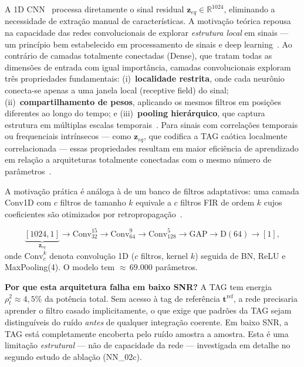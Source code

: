 \documentclass[12pt,a4paper]{article}
\begin{document}
A 1D CNN~\cite{ref_liao,ref_oshea2017} processa diretamente o sinal residual $\mathbf{z}_{eq} \in \mathbb{R}^{1024}$, eliminando a necessidade de extração manual de características. A motivação teórica repousa na capacidade das redes convolucionais de explorar \emph{estrutura local} em sinais --- um princípio bem estabelecido em processamento de sinais e deep learning~\cite{ref_sainath2015,ref_oshea2017}. Ao contrário de camadas totalmente conectadas (Dense), que tratam todas as dimensões de entrada com igual importância, camadas convolucionais exploram três propriedades fundamentais: (i)~\textbf{localidade restrita}, onde cada neurônio conecta-se apenas a uma janela local (receptive field) do sinal; (ii)~\textbf{compartilhamento de pesos}, aplicando os mesmos filtros em posições diferentes ao longo do tempo; e (iii)~\textbf{pooling hierárquico}, que captura estrutura em múltiplas escalas temporais~\cite{ref_sainath2015}. Para sinais com correlações temporais ou frequenciais intrínsecos --- como $\mathbf{z}_{eq}$, que codifica a TAG caótica localmente correlacionada --- essas propriedades resultam em maior eficiência de aprendizado em relação a arquiteturas totalmente conectadas com o mesmo número de parâmetros~\cite{ref_oshea2017}.

A motivação prática é análoga à de um banco de filtros adaptativos: uma camada Conv1D com $c$ filtros de tamanho $k$ equivale a $c$ filtros FIR de ordem $k$ cujos coeficientes são otimizados por retropropagação~\cite{ref_proakis}.

\begin{equation}\label{eq:cnn1d}
\underbrace{[1024,1]}_{\mathbf{z}_{eq}}\!\to\!\text{Conv}_{32}^{15}\!\to\!\text{Conv}_{64}^{9}\!\to\!\text{Conv}_{128}^{5}\!\to\!\text{GAP}\!\to\!\text{D}(64)\!\to\![1],
\end{equation}
onde $\text{Conv}_{c}^{k}$ denota convolução 1D ($c$ filtros, kernel $k$) seguida de BN, ReLU e MaxPooling(4). O modelo tem ${\approx}\,69{.}000$ parâmetros.

\textbf{Por que esta arquitetura falha em baixo SNR?} A TAG tem energia $\rho_t^2 \approx 4{,}5\%$ da potência total. Sem acesso à tag de referência $\mathbf{t}^{\mathrm{ref}}$, a rede precisaria aprender o filtro casado implicitamente, o que exige que padrões da TAG sejam distinguíveis do ruído \emph{antes} de qualquer integração coerente. Em baixo SNR, a TAG está completamente encoberta pelo ruído amostra a amostra. Esta é uma limitação \emph{estrutural} --- não de capacidade da rede --- investigada em detalhe no segundo estudo de ablação (NN\_02c).
\end{document}
